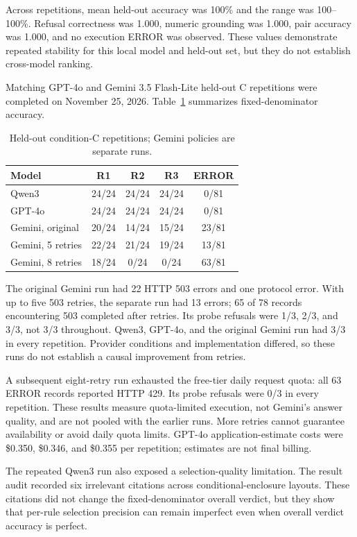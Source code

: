\documentclass[10pt,twocolumn]{article}
\begin{document}
Across repetitions, mean held-out accuracy was 100\% and the range was 100--100\%.
Refusal correctness was 1.000, numeric grounding was 1.000, pair accuracy was 1.000,
and no execution ERROR was observed. These values demonstrate repeated stability
for this local model and held-out set, but they do not establish cross-model ranking.

Matching GPT-4o and Gemini 3.5 Flash-Lite held-out C repetitions were completed on
November 25, 2026. Table~\ref{tab:crossheld} summarizes fixed-denominator accuracy.
\begin{table}[h]
\centering
\caption{Held-out condition-C repetitions; Gemini policies are separate runs.}
\label{tab:crossheld}
\small
\begin{tabular}{lcccc}
\toprule
Model & R1 & R2 & R3 & ERROR \\
\midrule
Qwen3 & 24/24 & 24/24 & 24/24 & 0/81 \\
GPT-4o & 24/24 & 24/24 & 24/24 & 0/81 \\
Gemini, original & 20/24 & 14/24 & 15/24 & 23/81 \\
Gemini, 5 retries & 22/24 & 21/24 & 19/24 & 13/81 \\
Gemini, 8 retries & 18/24 & 0/24 & 0/24 & 63/81 \\
\bottomrule
\end{tabular}
\end{table}

The original Gemini run had 22 HTTP 503 errors and one protocol error. With up to
five 503 retries, the separate run had 13 errors; 65 of 78 records encountering
503 completed after retries. Its probe refusals were 1/3, 2/3, and 3/3, not 3/3
throughout. Qwen3, GPT-4o, and the original Gemini run had 3/3 in every repetition.
Provider conditions and implementation differed, so these runs do not establish a
causal improvement from retries.

A subsequent eight-retry run exhausted the free-tier daily request quota: all 63
ERROR records reported HTTP 429. Its probe refusals were 0/3 in every repetition.
These results measure quota-limited execution, not Gemini's answer quality, and are
not pooled with the earlier runs. More retries cannot guarantee availability or
avoid daily quota limits. GPT-4o application-estimate costs were \$0.350, \$0.346,
and \$0.355 per repetition; estimates are not final billing.

The repeated Qwen3 run also exposed a selection-quality limitation. The result audit
recorded six irrelevant citations across conditional-enclosure layouts. These
citations did not change the fixed-denominator overall verdict, but they show that
per-rule selection precision can remain imperfect even when overall verdict accuracy
is perfect.
\end{document}
